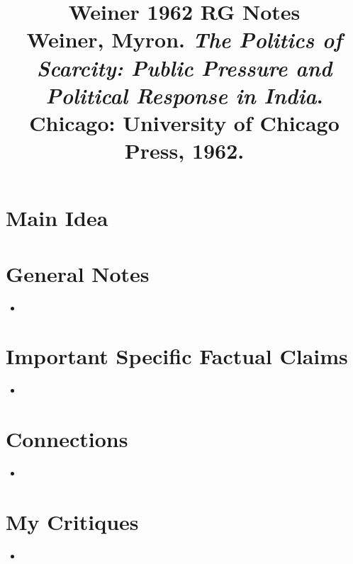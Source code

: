 \documentclass[12pt]{article}
\title{\textbf{Weiner 1962 RG Notes}\\
\large Weiner, Myron. \textit{The Politics of Scarcity: Public Pressure and Political Response in India}.\\
Chicago: University of Chicago Press, 1962.}
\author{}
\date{}
\begin{document}
\maketitle

\section{Main Idea}



\section{General Notes}

\begin{itemize}[leftmargin=*, itemsep=4pt]
    \item
\end{itemize}


\section{Important Specific Factual Claims}

\begin{itemize}[leftmargin=*, itemsep=4pt]
    \item
\end{itemize}


\section{Connections}

\begin{itemize}
    \item
\end{itemize}


\section{My Critiques}

\begin{itemize}
    \item
\end{itemize}
\end{document}
